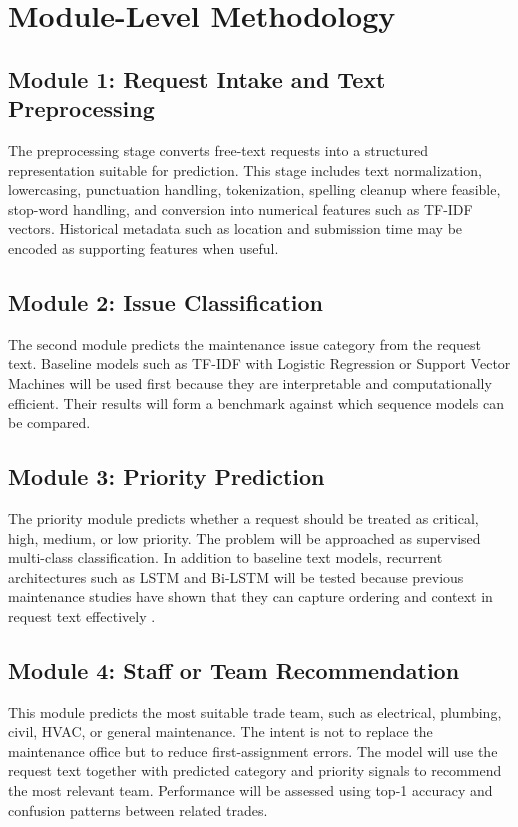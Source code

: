 \documentclass[11pt,a4paper]{report}
\begin{document}
\section{Module-Level Methodology}
\subsection{Module 1: Request Intake and Text Preprocessing}
The preprocessing stage converts free-text requests into a structured representation suitable for prediction. This stage includes text normalization, lowercasing, punctuation handling, tokenization, spelling cleanup where feasible, stop-word handling, and conversion into numerical features such as TF-IDF vectors. Historical metadata such as location and submission time may be encoded as supporting features when useful.

\subsection{Module 2: Issue Classification}
The second module predicts the maintenance issue category from the request text. Baseline models such as TF-IDF with Logistic Regression or Support Vector Machines will be used first because they are interpretable and computationally efficient. Their results will form a benchmark against which sequence models can be compared.

\subsection{Module 3: Priority Prediction}
The priority module predicts whether a request should be treated as critical, high, medium, or low priority. The problem will be approached as supervised multi-class classification. In addition to baseline text models, recurrent architectures such as \ac{LSTM} and Bi-LSTM will be tested because previous maintenance studies have shown that they can capture ordering and context in request text effectively \cite{dorazio2023}.

\subsection{Module 4: Staff or Team Recommendation}
This module predicts the most suitable trade team, such as electrical, plumbing, civil, HVAC, or general maintenance. The intent is not to replace the maintenance office but to reduce first-assignment errors. The model will use the request text together with predicted category and priority signals to recommend the most relevant team. Performance will be assessed using top-1 accuracy and confusion patterns between related trades.
\end{document}
